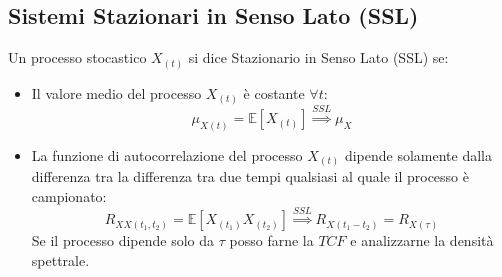     \subsection{Sistemi Stazionari in Senso Lato (SSL)}\label{Sitemi Stazionari in Senso Lato (SSL)}
        Un processo stocastico $X_{(t)}$ si dice Stazionario in Senso Lato (SSL) se:
        \begin{itemize}
            \item {Il valore medio del processo $X_{(t)}$ è costante $\forall t$:
                \[
                    \mu_{X(t)} = \mathbb{E}[X_{(t)}] \overset{SSL}{\Rightarrow} \mu_{X}    
                \]
            }
            \item {La funzione di autocorrelazione del processo $X_{(t)}$ dipende solamente dalla differenza tra la differenza 
                tra due tempi qualsiasi al quale il processo è campionato:
                \[
                    R_{XX(t_1,t_2)} = \mathbb{E}[X_{(t_1)}X_{(t_2)}] \overset{SSL}{\Rightarrow} R_{X(t_1-t_2)} = R_{X(\tau)}      
                \]
                Se il processo dipende solo da $\tau$ posso farne la $TCF$ e analizzarne la densità spettrale. 
                }
        \end{itemize} 
